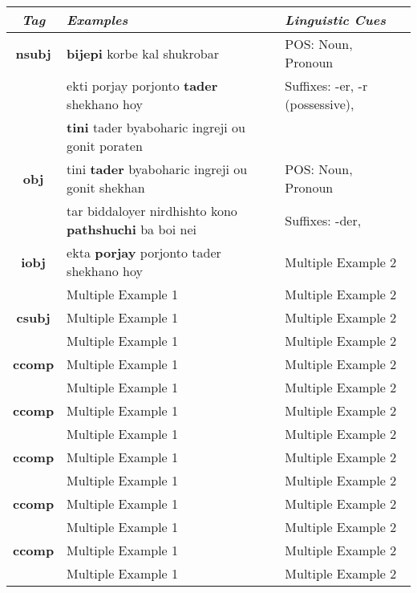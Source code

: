 \documentclass[a4 paper]{article}
\begin{document}
\begin{longtable}{cp{}p{}}
    \toprule
    \textit{Tag} & \textit{Examples} & \textit{Linguistic Cues} \\ 
    \toprule
    \addlinespace[0.5em]
    \textbf{nsubj}
                 & \textbf{bijepi} korbe kal shukrobar
                 & POS: Noun, Pronoun\\
    \addlinespace[0.5em]
                 & ekti porjay porjonto \textbf{tader} shekhano hoy
                 & Suffixes: -er, -r (possessive), \\
    \addlinespace[0.5em]
                 & \textbf{tini} tader byaboharic ingreji ou gonit poraten
                 & \\
    \midrule
    \addlinespace[0.5em]
    \textbf{obj}
                 & tini \textbf{tader} byaboharic ingreji ou gonit shekhan
                 & POS: Noun, Pronoun \\
    \addlinespace[0.5em]
                 & tar biddaloyer nirdhishto kono \textbf{pathshuchi} ba boi nei
                 & Suffixes: -der, \\
    \midrule
    \addlinespace[0.5em]
    \textbf{iobj}
                 & ekta \textbf{porjay} porjonto tader shekhano hoy
                 & Multiple Example 2\\
    \addlinespace[0.5em]
                 & Multiple Example 1 
                 & Multiple Example 2\\
    \midrule
    \addlinespace[0.5em]
    \textbf{csubj}
                 & Multiple Example 1 & Multiple Example 2\\
    \addlinespace[0.5em]
                 & Multiple Example 1 & Multiple Example 2\\
    \midrule
    \addlinespace[0.5em]
    \textbf{ccomp}
                 & Multiple Example 1 & Multiple Example 2\\
    \addlinespace[0.5em]
                 & Multiple Example 1 & Multiple Example 2\\
    \midrule
    \addlinespace[0.5em]
    \textbf{ccomp}
                 & Multiple Example 1 & Multiple Example 2\\
    \addlinespace[0.5em]
                 & Multiple Example 1 & Multiple Example 2\\
    \midrule
    \addlinespace[0.5em]
    \textbf{ccomp}
                 & Multiple Example 1 & Multiple Example 2\\
    \addlinespace[0.5em]
                 & Multiple Example 1 & Multiple Example 2\\
    \midrule
    \addlinespace[0.5em]
    \textbf{ccomp}
                 & Multiple Example 1 & Multiple Example 2\\
    \addlinespace[0.5em]
                 & Multiple Example 1 & Multiple Example 2\\
    \midrule
    \addlinespace[0.5em]
    \textbf{ccomp}
                 & Multiple Example 1 & Multiple Example 2\\
    \addlinespace[0.5em]
                 & Multiple Example 1 & Multiple Example 2\\
    \midrule
    

\end{longtable}
\end{document}
